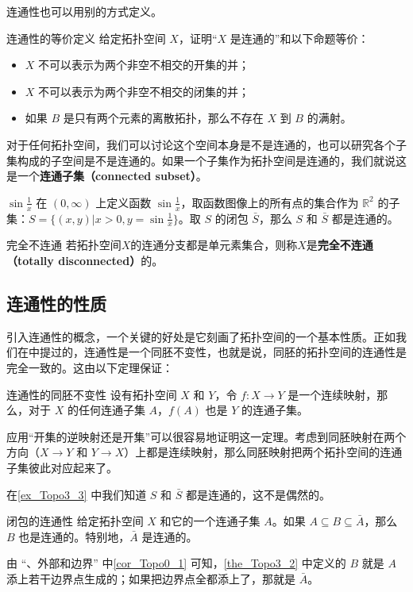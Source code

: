 连通性也可以用别的方式定义。

\begin{exercise}{连通性的等价定义}\label{exe_Topo3_1}
给定拓扑空间 $X$，证明“$X$ 是连通的”和以下命题等价：
\begin{itemize}
\item $X$ 不可以表示为两个非空不相交的开集的并；
\item $X$ 不可以表示为两个非空不相交的闭集的并；
\item 如果 $B$ 是只有两个元素的离散拓扑，那么不存在 $X$ 到 $B$ 的满射。

\end{itemize}
\end{exercise}

对于任何拓扑空间，我们可以讨论这个空间本身是不是连通的，也可以研究各个子集构成的子空间是不是连通的。如果一个子集作为拓扑空间是连通的，我们就说这是一个\textbf{连通子集（connected subset）}。

\begin{example}{$\sin{\frac{1}{x}}$}\label{ex_Topo3_3}
在 $(0,\infty)$ 上定义函数 $\sin{\frac{1}{x}}$，取函数图像上的所有点的集合作为 $\mathbb{R}^2$ 的子集：$S=\{(x, y)|x>0, y=\sin{\frac{1}{x}}\}$。取 $S$ 的闭包 $\bar{S}$，那么 $S$ 和 $\bar{S}$ 都是连通的。
\end{example}


\begin{definition}{完全不连通}
若拓扑空间$X$的连通分支都是单元素集合，则称$X$是\textbf{完全不连通（totally disconnected）}的。
\end{definition}

\subsection{连通性的性质}

引入连通性的概念，一个关键的好处是它刻画了拓扑空间的一个基本性质。正如我们在中提过的，连通性是一个同胚不变性，也就是说，同胚的拓扑空间的连通性是完全一致的。这由以下定理保证：

\begin{theorem}{连通性的同胚不变性}\label{the_Topo3_1}
设有拓扑空间 $X$ 和 $Y$，令 $f:X\rightarrow Y$ 是一个连续映射，那么，对于 $X$ 的任何连通子集 $A$，$f(A)$ 也是 $Y$ 的连通子集。
\end{theorem}

应用“开集的逆映射还是开集”可以很容易地证明这一定理。考虑到同胚映射在两个方向（$X\rightarrow Y$ 和 $Y\rightarrow X$）上都是连续映射，那么同胚映射把两个拓扑空间的连通子集彼此对应起来了。

在\autoref{ex_Topo3_3} 中我们知道 $S$ 和 $\bar{S}$ 都是连通的，这不是偶然的。

\begin{theorem}{闭包的连通性}\label{the_Topo3_2}
给定拓扑空间 $X$ 和它的一个连通子集 $A$。如果 $A\subseteq B\subseteq\bar{A}$，那么 $B$ 也是连通的。特别地，$\bar{A}$ 是连通的。
\end{theorem}

由 “、外部和边界” 中\autoref{cor_Topo0_1} 可知，\autoref{the_Topo3_2} 中定义的 $B$ 就是 $A$ 添上若干边界点生成的；如果把边界点全都添上了，那就是 $\bar{A}$。
